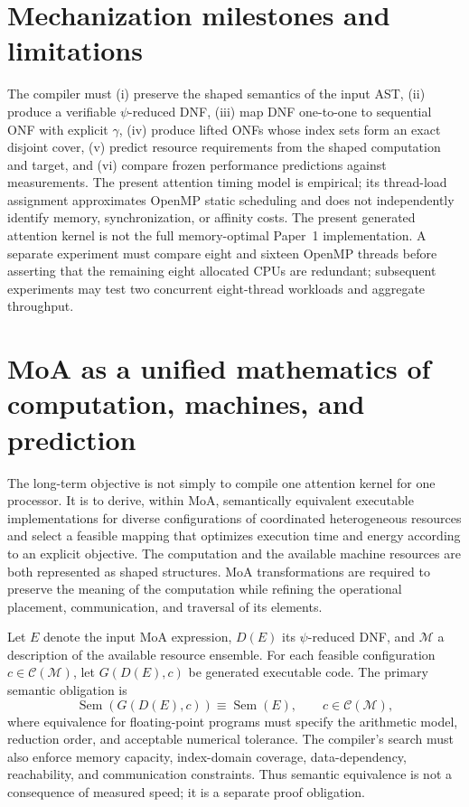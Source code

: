 \documentclass[11pt]{article}
\begin{document}
\section{Mechanization milestones and limitations}
The compiler must (i) preserve the shaped semantics of the input AST, (ii) produce a verifiable $\psi$-reduced DNF, (iii) map DNF one-to-one to sequential ONF with explicit $\gamma$, (iv) produce lifted ONFs whose index sets form an exact disjoint cover, (v) predict resource requirements from the shaped computation and target, and (vi) compare frozen performance predictions against measurements. The present attention timing model is empirical; its thread-load assignment approximates OpenMP static scheduling and does not independently identify memory, synchronization, or affinity costs. The present generated attention kernel is not the full memory-optimal Paper~1 implementation. A separate experiment must compare eight and sixteen OpenMP threads before asserting that the remaining eight allocated CPUs are redundant; subsequent experiments may test two concurrent eight-thread workloads and aggregate throughput.

\section{MoA as a unified mathematics of computation, machines, and prediction}
The long-term objective is not simply to compile one attention kernel for one processor. It is to derive, within MoA, semantically equivalent executable implementations for diverse configurations of coordinated heterogeneous resources and select a feasible mapping that optimizes execution time and energy according to an explicit objective. The computation and the available machine resources are both represented as shaped structures. MoA transformations are required to preserve the meaning of the computation while refining the operational placement, communication, and traversal of its elements.

Let $E$ denote the input MoA expression, $D(E)$ its $\psi$-reduced DNF, and $\mathcal{M}$ a description of the available resource ensemble. For each feasible configuration $c\in\mathcal{C}(\mathcal{M})$, let $G(D(E),c)$ be generated executable code. The primary semantic obligation is
\begin{equation}
\operatorname{Sem}(G(D(E),c))\equiv\operatorname{Sem}(E),\qquad c\in\mathcal{C}(\mathcal{M}),
\end{equation}
where equivalence for floating-point programs must specify the arithmetic model, reduction order, and acceptable numerical tolerance. The compiler's search must also enforce memory capacity, index-domain coverage, data-dependency, reachability, and communication constraints. Thus semantic equivalence is not a consequence of measured speed; it is a separate proof obligation.
\end{document}
